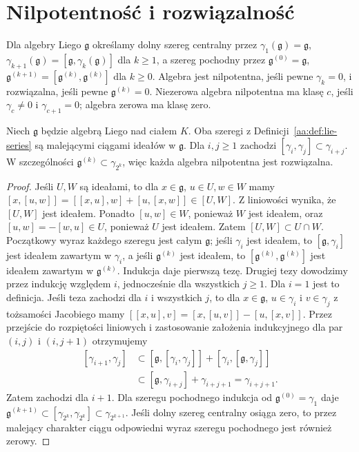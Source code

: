 \section{Nilpotentność i rozwiązalność}

\begin{definicja}
\label{aa:def:lie-series}
Dla algebry Liego $\mathfrak g$ określamy dolny
szereg centralny przez $\gamma_1(\mathfrak g)=\mathfrak g$,
$\gamma_{k+1}(\mathfrak g)=[\mathfrak g,\gamma_k(\mathfrak g)]$
dla $k\ge1$, a szereg pochodny przez
$\mathfrak g^{(0)}=\mathfrak g$,
$\mathfrak g^{(k+1)}=[\mathfrak g^{(k)},\mathfrak g^{(k)}]$
dla $k\ge0$.
Algebra jest nilpotentna, jeśli pewne $\gamma_k=0$,
i rozwiązalna, jeśli pewne $\mathfrak g^{(k)}=0$.
Niezerowa algebra nilpotentna ma klasę $c$, jeśli
$\gamma_c\ne0$ i $\gamma_{c+1}=0$; algebra zerowa
ma klasę zero.
\end{definicja}

\begin{lemat}
\label{aa:lem:lie-series}
Niech $\mathfrak g$ będzie algebrą Liego nad ciałem $K$.
Oba szeregi z Definicji~\ref{aa:def:lie-series}
są malejącymi ciągami ideałów w $\mathfrak g$.
Dla $i,j\ge1$ zachodzi
$[\gamma_i,\gamma_j]\subset\gamma_{i+j}$.
W szczególności $\mathfrak g^{(k)}\subset\gamma_{2^k}$,
więc każda algebra nilpotentna jest rozwiązalna.
\end{lemat}
\begin{proof}
Jeśli $U,W$ są ideałami, to dla $x\in\mathfrak g$,
$u\in U,w\in W$ mamy
$[x,[u,w]]=[[x,u],w]+[u,[x,w]]\in[U,W]$.
Z liniowości wynika, że $[U,W]$ jest ideałem.
Ponadto $[u,w]\in W$, ponieważ $W$ jest ideałem,
oraz $[u,w]=-[w,u]\in U$, ponieważ $U$ jest ideałem.
Zatem $[U,W]\subset U\cap W$. Początkowy wyraz
każdego szeregu jest całym $\mathfrak g$; jeśli
$\gamma_i$ jest ideałem, to $[\mathfrak g,\gamma_i]$
jest ideałem zawartym w $\gamma_i$, a jeśli
$\mathfrak g^{(k)}$ jest ideałem, to
$[\mathfrak g^{(k)},\mathfrak g^{(k)}]$ jest
ideałem zawartym w $\mathfrak g^{(k)}$.
Indukcja daje pierwszą tezę.
Drugiej tezy dowodzimy przez indukcję względem $i$,
jednocześnie dla wszystkich $j\ge1$.
Dla $i=1$ jest to definicja. Jeśli teza zachodzi
dla $i$ i wszystkich $j$, to dla $x\in\mathfrak g$, $u\in\gamma_i$ i $v\in\gamma_j$
z tożsamości Jacobiego mamy
$[[x,u],v]=[x,[u,v]]-[u,[x,v]]$.
Przez przejście do rozpiętości liniowych i zastosowanie
założenia indukcyjnego dla par $(i,j)$ i $(i,j+1)$
otrzymujemy
\[
\begin{aligned}
 [\gamma_{i+1},\gamma_j]
 &\subset[\mathfrak g,[\gamma_i,\gamma_j]]
       +[\gamma_i,[\mathfrak g,\gamma_j]]\\
 &\subset[\mathfrak g,\gamma_{i+j}]+\gamma_{i+j+1}
 =\gamma_{i+j+1}.
\end{aligned}
\]
Zatem zachodzi dla $i+1$. Dla szeregu pochodnego
indukcja od $\mathfrak g^{(0)}=\gamma_1$ daje
$\mathfrak g^{(k+1)}\subset
[\gamma_{2^k},\gamma_{2^k}]\subset\gamma_{2^{k+1}}$.
Jeśli dolny szereg centralny osiąga zero, to przez
malejący charakter ciągu odpowiedni wyraz szeregu
pochodnego jest również zerowy.
\end{proof}

